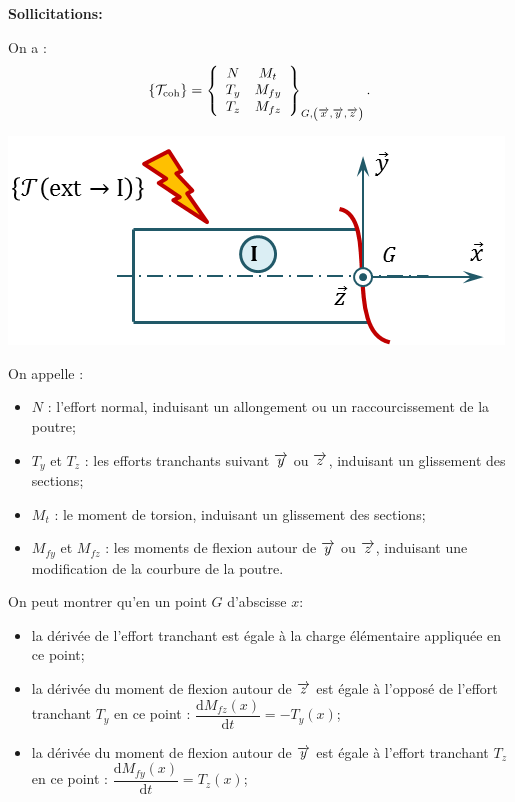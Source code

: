 \documentclass[10pt,fleqn]{article} %
\begin{document}
\begin{defi}
\textbf{Sollicitations:} ~\\

\begin{minipage}[c]{.65\linewidth}
On a : 
$$
\{\mathcal{T}_{\text{coh}}\} = \torseurcol{N}{T_y}{T_z}{M_t}{M_{fy}}{M_{fz}}{G,\left(\vx{}, \vy{}, \vz{} \right)}.
$$
\end{minipage} \hfill
\begin{minipage}[c]{.3\linewidth}
\begin{center}
\includegraphics[width=\linewidth]{images/sollicitations}
\end{center}
\end{minipage}

On appelle :
\begin{itemize}
\item $N$ : l'effort normal, induisant un allongement ou un raccourcissement de la poutre;
\item $T_y$ et $T_z$ : les efforts tranchants suivant $\vy{}$ ou $\vz{}$, induisant un glissement des sections;
\item $M_{t}$ : le moment de torsion, induisant un glissement des sections; 
\item $M_{fy}$ et $M_{fz}$ : les moments de flexion autour de $\vy{}$ ou $\vz{}$, induisant une modification de la courbure de la poutre.
\end{itemize}

\end{defi}


\begin{rem}
On peut montrer qu'en un point $G$ d'abscisse $x$:
\begin{itemize}
\item la dérivée de l'effort tranchant est égale à la charge élémentaire appliquée en ce point;
\item la dérivée du moment de flexion autour de $\vect{z}$ est égale à l'opposé de l'effort tranchant $T_y$ en ce point : $\dfrac{\text{d}M_{fz}(x)}{\text{d}t}=-T_y(x)$;
\item la dérivée du moment de flexion autour de $\vect{y}$ est égale à l'effort tranchant $T_z$ en ce point : $\dfrac{\text{d}M_{fy}(x)}{\text{d}t}=T_z(x)$;
\end{itemize}
\end{rem}
\end{document}
